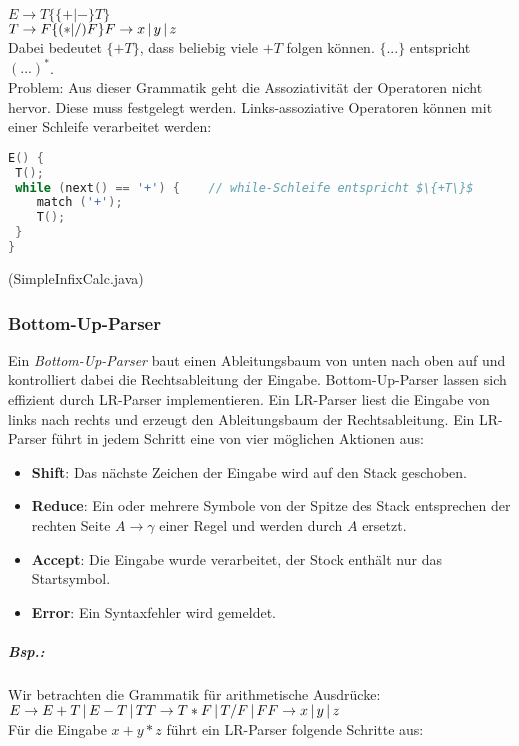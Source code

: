 \documentclass{scrreprt}
\begin{document}
$E\to T \{ \{+|-\} T \}$\\
$T \to F \{ (*|/)F\}\\
F \to x\,|\,y\,|\,z$\\
Dabei bedeutet $\{ +T \}$, dass beliebig viele $+T$ folgen können. $\{...\}$ entspricht $(...)^*$.\\
Problem: Aus dieser Grammatik geht die Assoziativität der Operatoren nicht hervor. Diese muss festgelegt werden. Links-assoziative Operatoren können mit einer Schleife verarbeitet werden:
\begin{lstlisting}[language=C]
E() {
 T();
 while (next() == '+') {	// while-Schleife entspricht $\{+T\}$
 	match ('+');
 	T();
 }
}
\end{lstlisting}
(SimpleInfixCalc.java)


\subsubsection{Bottom-Up-Parser}
Ein \emph{Bottom-Up-Parser} baut einen Ableitungsbaum von unten nach oben auf und kontrolliert dabei die Rechtsableitung der Eingabe. Bottom-Up-Parser lassen sich effizient durch LR-Parser implementieren. Ein LR-Parser liest die Eingabe von links nach rechts und erzeugt den Ableitungsbaum der Rechtsableitung. Ein LR-Parser führt in jedem Schritt eine von vier möglichen Aktionen aus:
\begin{itemize}
\item \textbf{Shift}: Das nächste Zeichen der Eingabe wird auf den Stack geschoben.
\item \textbf{Reduce}: Ein oder mehrere Symbole von der Spitze des Stack entsprechen der rechten Seite $A \to \gamma$ einer Regel und werden durch $A$ ersetzt.
\item \textbf{Accept}: Die Eingabe wurde verarbeitet, der Stock enthält nur das Startsymbol.
\item \textbf{Error}: Ein Syntaxfehler wird gemeldet.
\end{itemize}
\subparagraph{Bsp.:} Wir betrachten die Grammatik für arithmetische Ausdrücke:\\
$E \to E + T \,|\, E-T \,|\, T\\
T \to T*F \,|\, T/F \,|\, F\\
F \to x \,|\, y \,|\, z$\\
Für die Eingabe $x+y*z$ führt ein LR-Parser folgende Schritte aus:\\
\end{document}
